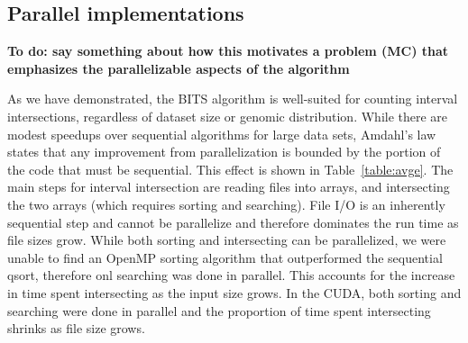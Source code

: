 \documentclass{bioinfo}
\begin{document}


        \subsection{Parallel implementations}
        
        \textbf{To do: say something about how this motivates a problem (MC)
        that emphasizes the parallelizable aspects of the algorithm}
        
        As we have demonstrated, the BITS algorithm is well-suited for counting interval
        intersections, regardless of dataset size or genomic distribution.  While there
        are modest speedups over sequential algorithms for large data sets, Amdahl's
        law~\cite{amdahl1967} states that any improvement from parallelization is
        bounded by  the portion of the code that must be sequential.  This effect is
        shown in Table~\ref{table:avge}.  The main steps for interval intersection are
        reading files into arrays, and intersecting the two arrays (which requires
        sorting and searching).  File I/O is an inherently sequential step and cannot be
        parallelize and therefore dominates the run time as file sizes grow.  While both
        sorting and intersecting can be parallelized, we were unable to find an OpenMP
        sorting algorithm that outperformed the sequential qsort, therefore onl
        searching was done in parallel.  This accounts for the increase in time spent
        intersecting as the input size grows.  In the CUDA, both sorting and searching
        were done in parallel and the proportion of time spent intersecting shrinks as
        file size grows.
        
\end{document}
